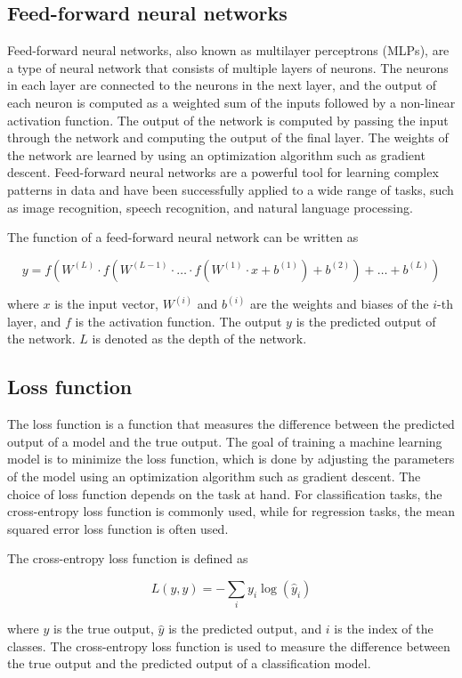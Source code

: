 \subsection{Feed-forward neural networks}

Feed-forward neural networks, also known as multilayer perceptrons (MLPs), are a type of neural network that consists of multiple layers of neurons. The neurons in each layer are connected to the neurons in the next layer, and the output of each neuron is computed as a weighted sum of the inputs followed by a non-linear activation function. The output of the network is computed by passing the input through the network and computing the output of the final layer. The weights of the network are learned by using an optimization algorithm such as gradient descent. Feed-forward neural networks are a powerful tool for learning complex patterns in data and have been successfully applied to a wide range of tasks, such as image recognition, speech recognition, and natural language processing.

The function of a feed-forward neural network can be written as

$$ 
    y = f(W^{(L)} \cdot f(W^{(L-1)} \cdot \ldots \cdot f(W^{(1)} \cdot x + b^{(1)}) + b^{(2)}) + \ldots + b^{(L)})
$$

where $x$ is the input vector, $W^{(i)}$ and $b^{(i)}$ are the weights and biases of the $i$-th layer, and $f$ is the activation function. The output $y$ is the predicted output of the network. $L$ is denoted as the depth of the network.

\subsection{Loss function}
The loss function is a function that measures the difference between the predicted output of a model and the true output. The goal of training a machine learning model is to minimize the loss function, which is done by adjusting the parameters of the model using an optimization algorithm such as gradient descent. The choice of loss function depends on the task at hand. For classification tasks, the cross-entropy loss function is commonly used, while for regression tasks, the mean squared error loss function is often used.

The cross-entropy loss function is defined as 

$$
    L(y, \hat{y}) = -\sum_{i} y_i \log(\hat{y}_i)
$$

where $y$ is the true output, $\hat{y}$ is the predicted output, and $i$ is the index of the classes. The cross-entropy loss function is used to measure the difference between the true output and the predicted output of a classification model.

